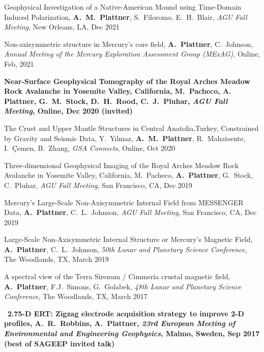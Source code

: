 \documentclass[10pt]{article}
\begin{document}
\spcp
Geophysical Investigation of a Native-American Mound using Time-Domain Induced Polarization, \textbf{A.~M.~Plattner}, S.~Filoromo. E.~H.~Blair, \emph{AGU Fall Meeting}, New Orleans, LA, Dec 2021


\spcp
Non-axisymmetric structure in Mercury's core field, \textbf{A.~Plattner}, C.~Johnson, \emph{Annual Meeting of the Mercury Exploration Assessment Group (MExAG)}, Online, Feb, 2021

\spcp
\hspace{-0.4cm} \gr \hspace{-0.03cm} \textbf{Near-Surface Geophysical Tomography of the Royal Arches Meadow Rock Avalanche in Yosemite Valley, California, M.~Pacheco, {\normalfont A. Plattner}, G.~M.~Stock, D.~H.~Rood, C.~J.~Pluhar, \emph{AGU Fall Meeting}, Online, Dec 2020 (invited)}

\spcp
\hspace{-0.4cm} \gr \hspace{-0.03cm} The Crust and Upper Mantle Structures in Central Anatolia,Turkey, Constrained by Gravity and Seismic Data, Y.~Y\i lmaz, \textbf{A.~M.~Plattner}, R.~Mahatsente, I.~\c Cemen, B.~Zhang, \emph{GSA Connects}, Online, Oct 2020

\spcp
\hspace{-0.4cm} \gr \hspace{-0.03cm} Three-dimensional Geophysical Imaging of the Royal Arches Meadow Rock Avalanche in Yosemite Valley, California, M.~Pacheco, \textbf{A.~Plattner}, G.~Stock, C.~Pluhar, \emph{AGU Fall Meeting}, San Francisco, CA, Dec 2019

\spcp
Mercury's Large-Scale Non-Axisymmetric Internal Field from MESSENGER Data, \textbf{A.~Plattner}, C.~L.~Johnson, \emph{AGU Fall Meeting}, San Francisco, CA, Dec 2019

\spcp
Large-Scale Non-Axisymmetric Internal Structure or Mercury's Magnetic Field,
\textbf{A.~Plattner}, C.~L.~Johnson, \emph{50th Lunar and Planetary Science Conference},
The Woodlands, TX, March 2019

\spcp
A spectral view of the Terra Sirenum / Cimmeria crustal magnetic field, \textbf{A.~Plattner}, F.J.~Simons, G.~Golabek, \emph{48th Lunar and Planetary Science Conference}, The Woodlands, TX, March 2017

\spcp 
\hspace{-0.4cm}\ug \, \textbf{2.75-D ERT: Zigzag electrode acquisition strategy
to improve 2-D profiles,
A.~R.~Robbins, {\normalfont A.~Plattner},
\emph{23rd European Meeting of Environmental and Engineering Geophysics}, Malmo, Sweden, Sep 2017 (best of SAGEEP invited talk)}
\end{document}
